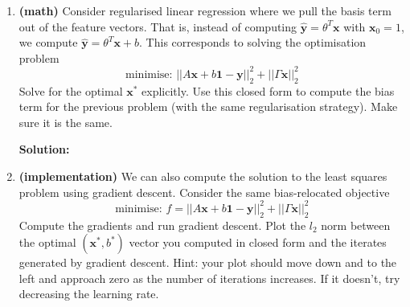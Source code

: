\documentclass[letter,11pt]{article}
\newenvironment{solution}{
    \vspace{0.16in} {\bf Solution:}
    
}{
	\vspace{0.16in}
}
\begin{document}
\begin{enumerate}
\begin{enumerate}
        \begin{solution}
        \end{solution}

        \item \textbf{(math)} Consider regularised linear regression where we pull the basis term out of the feature vectors. That is, instead of computing $\hat{\textbf{y}} = \theta^T \textbf{x}$ with $\textbf{x}_0 = 1$, we compute $\hat{\textbf{y}} = \theta^T \textbf{x} + b$. This corresponds to solving the optimisation problem \[\text{minimise: } ||A\textbf{x} + b\textbf{1} - \textbf{y}||^2_2 + ||\Gamma \textbf{x}||_2^2\] Solve for the optimal $\textbf{x}^*$ explicitly. Use this closed form to compute the bias term for the previous problem (with the same regularisation strategy). Make sure it is the same.

        \begin{solution}
        \end{solution}

        \item \textbf{(implementation)} We can also compute the solution to the least squares problem using gradient descent. Consider the same bias-relocated objective \[\text{minimise: } f = ||A\textbf{x} + b\textbf{1} - \textbf{y}||_2^2 + ||\Gamma \textbf{x}||_2^2\] Compute the gradients and run gradient descent. Plot the $l_2$ norm between the optimal $(\textbf{x}^*, b^*)$ vector you computed in closed form and the iterates generated by gradient descent. Hint: your plot should move down and to the left and approach zero as the number of iterations increases. If it doesn't, try decreasing the learning rate.
    \end{enumerate}
\end{enumerate}
\end{document}
